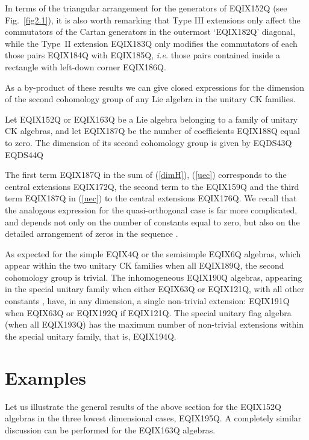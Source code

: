 In terms of the triangular arrangement for the generators of
EQIX152Q (see Fig.~\ref{fig2.1}), it is also  worth remarking
that   Type III extensions only affect the commutators of the Cartan
generators in the outermost `EQIX182Q' diagonal, while the Type~II extension
EQIX183Q  only modifies the commutators of each those pairs
EQIX184Q with EQIX185Q, {\it i.e.} those pairs
contained inside a rectangle
with left-down corner EQIX186Q.

As a by-product of these results we can give closed expressions for
the dimension of the second cohomology group of any Lie algebra in
the unitary CK families.

\begin{proposition}
\label{prop4.1}
Let EQIX152Q or EQIX163Q
be a Lie algebra belonging
to a family of unitary CK algebras, and let EQIX187Q be the
number of coefficients EQIX188Q equal to zero. The dimension of
its second cohomology group is given by
EQDS43Q
EQDS44Q
\end{proposition}

The first term EQIX187Q in the sum of (\ref{dimH}), (\ref{uec}) corresponds to the
central extensions EQIX172Q, the second term  to the EQIX159Q and the third term EQIX187Q in (\ref{uec})
to the central extensions EQIX176Q. We recall that the analogous
expression for the quasi-orthogonal case is far more complicated,
and depends not only on the number of constants equal to zero, but
also on the detailed arrangement of zeros in the sequence  \cite{Azc.Her.Bue.San:96}.

As expected for the simple
EQIX4Q or the semisimple EQIX6Q algebras, which appear within the
two unitary CK families when all
EQIX189Q, the second cohomology group is trivial. The inhomogeneous
EQIX190Q algebras, appearing in the special unitary family when either
EQIX63Q or
EQIX121Q, with all other constants , have, in any dimension, a single non-trivial extension:
EQIX191Q when EQIX63Q or EQIX192Q if EQIX121Q.
The  special unitary flag algebra (when all EQIX193Q) has the maximum
number of non-trivial extensions within the special unitary family, that
is, EQIX194Q.

\section{Examples}
\label{sec.4}

Let us illustrate the general results of the above section for the
EQIX152Q algebras in the three lowest dimensional cases,
EQIX195Q. A completely similar discussion can be performed for the
EQIX163Q algebras.

